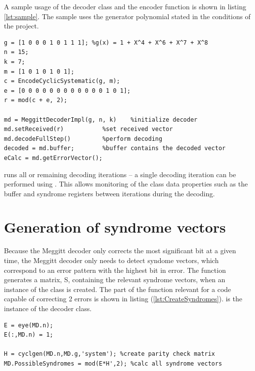 \documentclass[Main]{subfiles}
\begin{document}
A sample usage of the decoder class and the encoder function is shown in listing \ref{lst:sample}. The sample uses the generator polynomial stated in the conditions of the project.


\begin{lstlisting}[label={lst:sample},captionpos=b, caption=Sample usage of the decoder.] 
%setup
g = [1 0 0 0 1 0 1 1 1]; %g(x) = 1 + X^4 + X^6 + X^7 + X^8
n = 15;
k = 7;
m = [1 0 1 0 1 0 1];
c = EncodeCyclicSystematic(g, m);
e = [0 0 0 0 0 0 0 0 0 0 0 0 1 0 1];
r = mod(c + e, 2);

md = MeggittDecoderImpl(g, n, k)	%initialize decoder
md.setReceived(r)			%set received vector
md.decodeFullStep()			%perform decoding
decoded = md.buffer;		%buffer contains the decoded vector
eCalc = md.getErrorVector();
\end{lstlisting}

 runs all or remaining decoding iterations -- a single decoding iteration can be performed using . This allows monitoring of the class data properties such as the buffer and syndrome registers between iterations during the decoding.

\section{Generation of syndrome vectors}
Because the Meggitt decoder only corrects the most significant bit at a given time, the Meggitt decoder only needs to detect syndome vectors, which correspond to an error pattern with the highest bit in error. The function  generates a matrix, S, containing the relevant syndrome vectors, when an instance of the  class is created. The part of the function relevant for a code capable of correcting 2 errors is shown in listing (\ref{lst:CreateSyndromes}).  is the instance of the decoder class.

\begin{lstlisting}[label={lst:CreateSyndromes},captionpos=b, caption=Creating possible syndrome vectors.] 
%create 2 bit error patterns with highest bit in error
E = eye(MD.n);
E(:,MD.n) = 1;

H = cyclgen(MD.n,MD.g,'system'); %create parity check matrix
MD.PossibleSyndromes = mod(E*H',2); %calc all syndrome vectors
\end{lstlisting}
\end{document}
